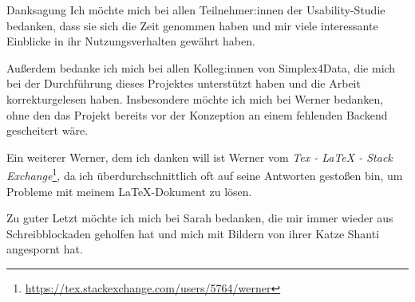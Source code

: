 \vspace*{0pt plus 1fill}
\begin{tucsimplesection}{Danksagung}
  Ich möchte mich bei allen Teilnehmer:innen der Usability-Studie bedanken, dass sie sich die Zeit genommen haben und mir viele interessante Einblicke in ihr Nutzungsverhalten gewährt haben.

  Außerdem bedanke ich mich bei allen Kolleg:innen von Simplex4Data, die mich bei der Durchführung dieses Projektes unterstützt haben und die Arbeit korrekturgelesen haben. Insbesondere möchte ich mich bei Werner bedanken, ohne den das Projekt bereits vor der Konzeption an einem fehlenden Backend gescheitert wäre.

  Ein weiterer Werner, dem ich danken will ist Werner vom \textit{Tex - LaTeX - Stack Exchange}\footnote{\url{https://tex.stackexchange.com/users/5764/werner}}, da ich überdurchschnittlich oft auf seine Antworten gestoßen bin, um Probleme mit meinem \LaTeX{}-Dokument zu lösen.

  Zu guter Letzt möchte ich mich bei Sarah bedanken, die mir immer wieder aus Schreibblockaden geholfen hat und mich mit Bildern von ihrer Katze Shanti angespornt hat.
\end{tucsimplesection}
\vspace*{0pt plus 2.5fill}
